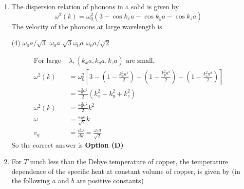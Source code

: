 \begin{enumerate}
\begin{tasks}(4)
\task[\textbf{A.}] $\omega_{0} a / \sqrt{3}$
\task[\textbf{B.}] $\omega_{0} a$
\task[\textbf{C.}] $\sqrt{3} \omega_{0} a$
\task[\textbf{D.}] $\omega_{0} a / \sqrt{2}$
\end{tasks}
\begin{answer}
\begin{align*}
\intertext{For large $\lambda,\left(k_{x} a, k_{y} a, k_{z} a\right)$ are small.}\\
\omega^{2}(k)&=\omega_{0}^{2}\left[3-\left(1-\frac{k_{x}^{2} a^{2}}{2}\right)-\left(1-\frac{k_{y}^{2} a^{2}}{2}\right)-\left(1-\frac{k_{z}^{2} a^{2}}{2}\right)\right]\\&=\frac{\omega_{0}^{2} a^{2}}{2}\left(k_{x}^{2}+k_{y}^{2}+k_{z}^{2}\right)\\
\omega^{2}(k)&=\frac{\omega_{0}^{2} a^{2}}{2} k^{2} \Rightarrow \omega=\frac{\omega_{0} a}{\sqrt{2}} k \Rightarrow v_{g}=\frac{d \omega}{d k}=\frac{\omega_{0} a}{\sqrt{2}}
\end{align*}
So the correct answer is \textbf{Option (D)}
\end{answer}
\item The dispersion relation of phonons in a solid is given by
$$
\omega^{2}(k)=\omega_{0}^{2}\left(3-\cos k_{x} a-\cos k_{y} a-\cos k_{z} a\right)
$$
The velocity of the phonons at large wavelength is
{}

\begin{tasks}(4)
\task[\textbf{A.}] $\omega_{0} a / \sqrt{3}$
\task[\textbf{B.}] $\omega_{0} a$
\task[\textbf{C.}] $\sqrt{3} \omega_{0} a$
\task[\textbf{D.}] $\omega_{0} a / \sqrt{2}$
\end{tasks}
\begin{answer}
$$\begin{aligned}
\text{For large }&\text{$\lambda,\left(k_{x} a, k_{y} a, k_{z} a\right)$ are small.}\\
\omega^{2}(k)&=\omega_{0}^{2}\left[3-\left(1-\frac{k_{x}^{2} a^{2}}{2}\right)-\left(1-\frac{k_{y}^{2} a^{2}}{2}\right)-\left(1-\frac{k_{z}^{2} a^{2}}{2}\right)\right]\\&=\frac{\omega_{0}^{2} a^{2}}{2}\left(k_{x}^{2}+k_{y}^{2}+k_{z}^{2}\right)\\
\omega^{2}(k)&=\frac{\omega_{0}^{2} a^{2}}{2} k^{2} \\ \omega&=\frac{\omega_{0} a}{\sqrt{2}} k \\ v_{g}&=\frac{d \omega}{d k}=\frac{\omega_{0} a}{\sqrt{2}}
\end{aligned}$$
So the correct answer is \textbf{Option (D)}
\end{answer}
\item For $T$ much less than the Debye temperature of copper, the temperature dependence of the specific heat at constant volume of copper, is given by (in the following $a$ and $b$ are positive constants)
{}


\end{enumerate}
